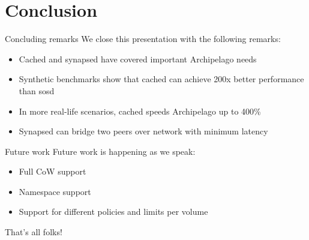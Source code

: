 \section{Conclusion}

\begin{frame}{Concluding remarks}
	We close this presentation with the following remarks:
	\begin{itemize}
		\item Cached and synapsed have covered important Archipelago needs
		\item Synthetic benchmarks show that cached can achieve 200x better 
			performance than sosd
		\item In more real-life scenarios, cached speeds Archipelago up to 
			400\%
		\item Synapsed can bridge two peers over network with minimum latency
	\end{itemize}
\end{frame}

\begin{frame}{Future work}
	Future work is happening as we speak:
	\begin{itemize}
		\item Full CoW support
		\item Namespace support
		\item Support for different policies and limits per volume
	\end{itemize}
\end{frame}

\begin{frame}{That's all folks!}


\end{frame}
